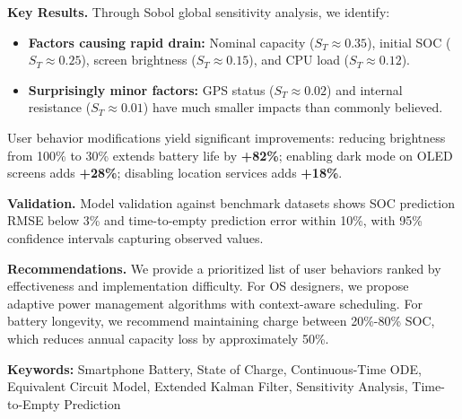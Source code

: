 \textbf{Key Results.} Through Sobol global sensitivity analysis, we identify:
\begin{itemize}[leftmargin=*]
    \item \textbf{Factors causing rapid drain:} Nominal capacity ($S_T \approx 0.35$), initial SOC ($S_T \approx 0.25$), screen brightness ($S_T \approx 0.15$), and CPU load ($S_T \approx 0.12$).
    \item \textbf{Surprisingly minor factors:} GPS status ($S_T \approx 0.02$) and internal resistance ($S_T \approx 0.01$) have much smaller impacts than commonly believed.
\end{itemize}

User behavior modifications yield significant improvements: reducing brightness from 100\% to 30\% extends battery life by \textbf{+82\%}; enabling dark mode on OLED screens adds \textbf{+28\%}; disabling location services adds \textbf{+18\%}.

\textbf{Validation.} Model validation against benchmark datasets shows SOC prediction RMSE below 3\% and time-to-empty prediction error within 10\%, with 95\% confidence intervals capturing observed values.

\textbf{Recommendations.} We provide a prioritized list of user behaviors ranked by effectiveness and implementation difficulty. For OS designers, we propose adaptive power management algorithms with context-aware scheduling. For battery longevity, we recommend maintaining charge between 20\%-80\% SOC, which reduces annual capacity loss by approximately 50\%.

\vspace{0.5cm}
\textbf{Keywords:} Smartphone Battery, State of Charge, Continuous-Time ODE, Equivalent Circuit Model, Extended Kalman Filter, Sensitivity Analysis, Time-to-Empty Prediction
